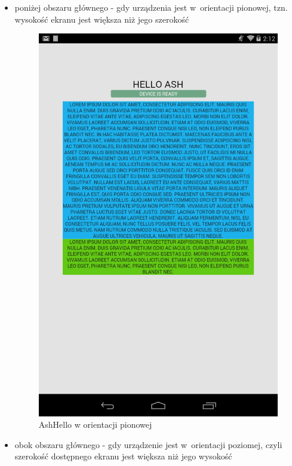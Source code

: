 \documentclass[brudnopis]{xmgr}
\begin{document}
\begin{itemize}
  \item poniżej obszaru głównego - gdy urządzenia jest w~orientacji pionowej, tzn. wysokość ekranu jest większa niż jego szerokość

\begin{figure}[h]
    \centering
    \includegraphics[scale=0.25]{hello1.png}
    \caption{AshHello w orientacji pionowej}
    \label{fig:AshHello1}
\end{figure}

  \item obok obszaru głównego - gdy urządzenie jest w~orientacji poziomej, czyli szerokość dostępnego ekranu jest większa niż jego wysokość 


\end{itemize}
\end{document}

